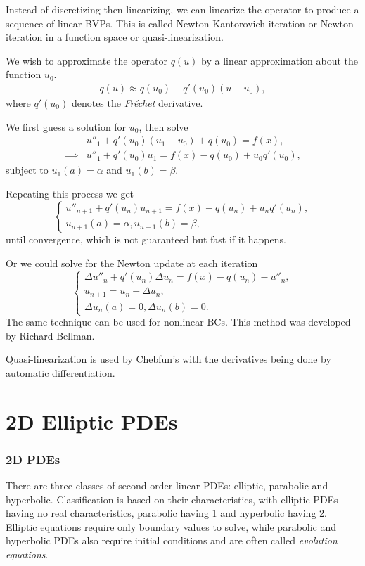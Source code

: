 \documentclass[12pt, a4paper]{article}
\theoremstyle{definition}
\theoremstyle{remark}
\numberwithin{equation}{section}
\begin{document}
Instead of discretizing then linearizing, we can linearize the operator to produce a sequence of linear BVPs. 
This is called Newton-Kantorovich iteration or Newton iteration in a function space or quasi-linearization. 

We wish to approximate the operator $q(u)$ by a linear approximation about the function $u_0$.
\begin{align*}
q(u) \approx q(u_0) + q'(u_0)(u-u_0),
\end{align*}
where $q'(u_0)$ denotes the \emph{Fr\'{e}chet} derivative.

We first guess a solution for $u_0$, then solve
\begin{align*}
&u''_1+q'(u_0)(u_1-u_0)+q(u_0)=f(x),\\
\implies &u''_1+q'(u_0)u_1=f(x)-q(u_0)+u_0q'(u_0),
\end{align*}
subject to $u_1(a)=\alpha$ and $u_1(b)=\beta$.

Repeating this process we get
\begin{equation*}
\begin{cases}
u''_{n+1}+q'(u_n)u_{n+1}=f(x)-q(u_n)+u_n q'(u_n),\\
u_{n+1}(a)=\alpha, u_{n+1}(b)=\beta,
\end{cases}
\end{equation*} 
until convergence, which is not guaranteed but fast if it happens.

Or we could solve for the Newton update at each iteration
\begin{equation*}
\begin{cases}
\Delta u''_{n}+q'(u_n)\Delta u_{n}=f(x)-q(u_n)-u''_n,\\
u_{n+1} = u_n + \Delta u_{n}, \\
\Delta u_{n}(a)=0, \Delta u_{n}(b)=0.
\end{cases}
\end{equation*} 
The same technique can be used for nonlinear BCs. 
This method was developed by Richard Bellman.

Quasi-linearization is used by  Chebfun's  with the derivatives being done by automatic differentiation. 


\newpage

\section{2D Elliptic PDEs}

\setcounter{subsubsection}{0}
\subsubsection{2D PDEs} 
There are three classes of second order linear PDEs: elliptic, parabolic and hyperbolic. Classification is based on their characteristics, with elliptic PDEs having no real characteristics, parabolic having 1 and hyperbolic having 2. Elliptic equations require only boundary values to solve, while parabolic and hyperbolic PDEs also require initial conditions and are often called \emph{evolution equations}.
\end{document}
